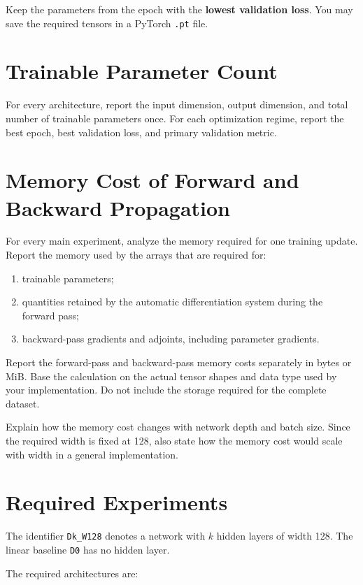\documentclass[11pt,a4paper]{article}
\newcommand{\code}[1]{\texttt{#1}}
\begin{document}
Keep the parameters from the epoch with the \textbf{lowest validation loss}. You may save the required tensors in a PyTorch \code{.pt} file.

\section{Trainable Parameter Count}

For every architecture, report the input dimension, output dimension, and total number of trainable parameters once. For each optimization regime, report the best epoch, best validation loss, and primary validation metric.

\section{Memory Cost of Forward and Backward Propagation}

For every main experiment, analyze the memory required for one training update. Report the memory used by the arrays that are required for:

\begin{enumerate}
    \item trainable parameters;
    \item quantities retained by the automatic differentiation system during the forward pass;
    \item backward-pass gradients and adjoints, including parameter gradients.
\end{enumerate}

Report the forward-pass and backward-pass memory costs separately in bytes or MiB. Base the calculation on the actual tensor shapes and data type used by your implementation. Do not include the storage required for the complete dataset.

Explain how the memory cost changes with network depth and batch size. Since the required width is fixed at 128, also state how the memory cost would scale with width in a general implementation.

\section{Required Experiments}

The identifier \code{Dk\_W128} denotes a network with $k$ hidden layers of width 128. The linear baseline \code{D0} has no hidden layer.

The required architectures are:
\end{document}
